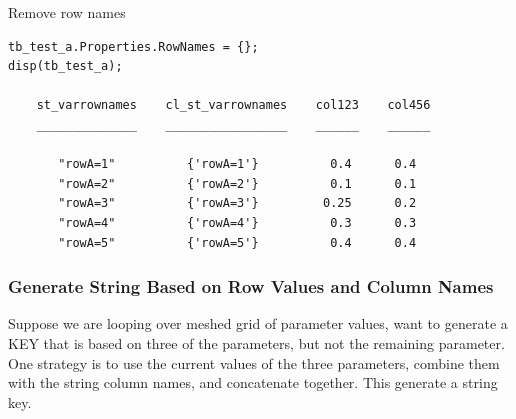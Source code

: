 \documentclass[
]{book}
\begin{document}
Remove row names

\begin{verbatim}
tb_test_a.Properties.RowNames = {};
disp(tb_test_a);

    st_varrownames    cl_st_varrownames    col123    col456
    ______________    _________________    ______    ______

       "rowA=1"          {'rowA=1'}          0.4      0.4  
       "rowA=2"          {'rowA=2'}          0.1      0.1  
       "rowA=3"          {'rowA=3'}         0.25      0.2  
       "rowA=4"          {'rowA=4'}          0.3      0.3  
       "rowA=5"          {'rowA=5'}          0.4      0.4  
\end{verbatim}

\hypertarget{generate-string-based-on-row-values-and-column-names}{%
\subsubsection{Generate String Based on Row Values and Column Names}\label{generate-string-based-on-row-values-and-column-names}}

Suppose we are looping over meshed grid of parameter values, want to
generate a KEY that is based on three of the parameters, but not the
remaining parameter. One strategy is to use the current values of the
three parameters, combine them with the string column names, and
concatenate together. This generate a string key.
\end{document}
